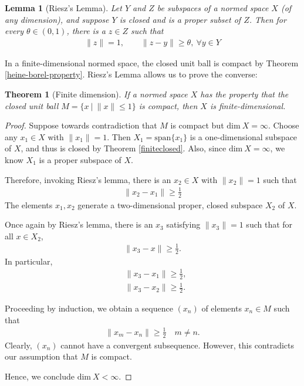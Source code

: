 \documentclass[11pt]{article}
\theoremstyle{mystyle}
\newtheorem{thm}{Theorem}[section]
\newtheorem{lm}{Lemma}[section]
\newcommand{\0}{\mathbf{0}}
\begin{document}
\begin{lm}[Riesz's Lemma]
Let $Y$ and $Z$ be subspaces of a normed space $X$ (of any dimension), and suppose $Y$ is closed and is a proper subset of $Z$. Then for every $\theta \in (0,1)$, there is a $z \in Z$ such that
\begin{align*}
    \|z\| = 1, \qquad \|z - y\| \geq \theta, \ \forall y \in Y
\end{align*}
\end{lm}

In a finite-dimensional normed space, the closed unit ball is compact by Theorem \ref{heine-borel-property}. Riesz's Lemma allows us to prove the converse:
\begin{thm}[Finite dimension]
If a normed space $X$ has the property that the closed unit ball $M = \{x \ | \ \|x\| \leq 1\}$ is compact, then $X$ is finite-dimensional.
\end{thm}
\begin{proof}
Suppose towards contradiction that $M$ is compact but $\text{dim}\ X = \infty$. Choose any $x_1 \in X$ with $\|x_1\| = 1$. Then $X_1 = \text{span}\{x_1\}$ is a one-dimensional subspace of $X$, and thus is closed by Theorem \ref{finiteclosed}. Also, since $\text{dim} \ X = \infty$, we know $X_1$ is a proper subspace of $X$.

Therefore, invoking Riesz's lemma, there is an $x_2 \in X$ with $\|x_2\| = 1$ such that
\begin{align*}
    \|x_2 - x_1\| \geq \frac{1}{2}
\end{align*}
The elements $x_1, x_2$ generate a two-dimensional proper, closed subspace $X_2$ of $X$.

Once again by Riesz's lemma, there is an $x_3$ satisfying $\|x_3\| = 1$ such that for all $x \in X_2$,
\begin{align*}
    \|x_3 - x\| \geq \frac{1}{2}.
\end{align*}
In particular,
\begin{align*}
    &\|x_3 - x_1\| \geq \frac{1}{2},\\
    &\|x_3 - x_2\| \geq \frac{1}{2}.
\end{align*}

Proceeding by induction, we obtain a sequence $(x_n)$ of elements $x_n \in M$ such that
\begin{align*}
    \|x_m - x_n\| \geq \frac{1}{2} \quad m \neq n.
\end{align*}
Clearly, $(x_n)$ cannot have a convergent subsequence. However, this contradicts our assumption that $M$ is compact.

Hence, we conclude $\text{dim} \ X < \infty$.
\end{proof}
\end{document}
